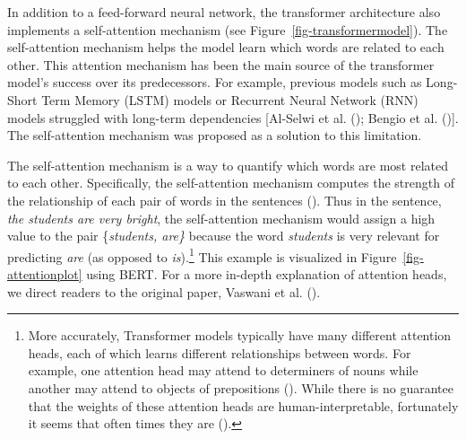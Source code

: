 \documentclass[
  12pt,
  letterpaper,
]{scrreprt}
\begin{document}
In addition to a feed-forward neural network, the transformer
architecture also implements a self-attention mechanism (see
Figure~\ref{fig-transformermodel}). The self-attention mechanism helps
the model learn which words are related to each other. This attention
mechanism has been the main source of the transformer model's success
over its predecessors. For example, previous models such as Long-Short
Term Memory (LSTM) models or Recurrent Neural Network (RNN) models
struggled with long-term dependencies {[}Al-Selwi et al.
(); Bengio et
al. (){]}. The
self-attention mechanism was proposed as a solution to this limitation.

The self-attention mechanism is a way to quantify which words are most
related to each other. Specifically, the self-attention mechanism
computes the strength of the relationship of each pair of words in the
sentences (). Thus in the sentence, \emph{the students are very bright}, the
self-attention mechanism would assign a high value to the pair
\{\emph{students, are\}} because the word \emph{students} is very
relevant for predicting \emph{are} (as opposed to \emph{is}).\footnote{More
  accurately, Transformer models typically have many different attention
  heads, each of which learns different relationships between words. For
  example, one attention head may attend to determiners of nouns while
  another may attend to objects of prepositions
  (). While
  there is no guarantee that the weights of these attention heads are
  human-interpretable, fortunately it seems that often times they are
  ().} This
example is visualized in Figure~\ref{fig-attentionplot} using BERT. For
a more in-depth explanation of attention heads, we direct readers to the
original paper, Vaswani et al.
().
\end{document}
